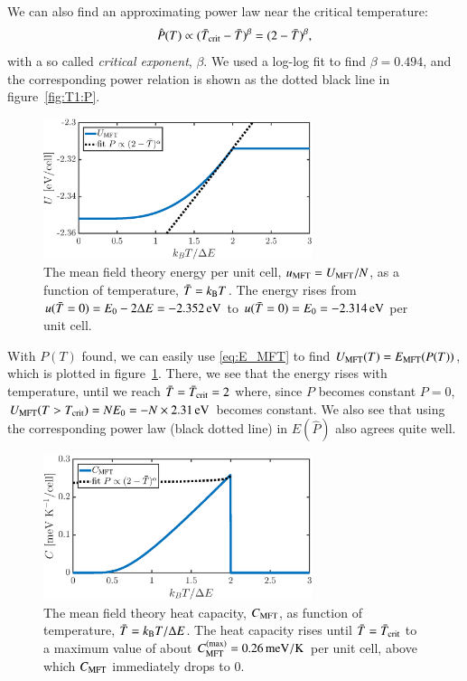 We can also find an approximating power law near the critical
temperature:
\begin{equation}\label{eq:alpha}
\hat{P}(T)\propto (\bar{T}_{\rm crit}-\bar{T})^{\beta}=(2-\bar{T})^{\beta},
\end{equation}
with a so called \emph{critical exponent}, $\beta$. We used a log-log
fit to find $\beta=0.494$, and the corresponding power relation is
shown as the dotted black line in figure~\ref{fig:T1:P}. 


\begin{figure}[!ht]
\begin{center}
  \includegraphics[width=0.7\textwidth]{../figures/E_MFT} 
  \caption{The mean field theory energy per unit cell,
    $u_{\text{MFT}}=U_{\text{MFT}}/N$, as a function of temperature,
    $\bar{T}=k_\mathrm{B} T$. The energy rises from
    $u(\bar{T}=0)=E_0-2\Delta{E}=\unit[-2.352]{eV}$ to
    $u(\bar{T}=0)=E_0=\unit[-2.314]{eV}$ per unit cell. }
  \label{fig:T1:E}
\end{center}
\end{figure}

With $P(T)$ found, we can easily use \eqref{eq:E_MFT} to find
$U_{\text{MFT}}(T)=E_{\text{MFT}}(P(T))$, which is plotted in
figure~\ref{fig:T1:E}. There, we see that the energy rises with
temperature, until we reach $\bar{T}=\bar{T}_{\rm crit}=2$ where,
since $P$ becomes constant $P=0$, $U_{\MFT}(T>T_{\rm crit})=N
E_0=-N\times\unit[2.31]{eV}$ becomes constant. We also see that using
the corresponding power law (black dotted line) in $E(\hat{P})$ also
agrees quite well. 

\begin{figure}[!ht]
\begin{center}
  \includegraphics[width=0.7\textwidth]{../figures/C_MFT} 
  \caption{The mean field theory heat capacity, $C_{\text{MFT}}$, as
    function of temperature, $\bar{T}=k_\mathrm{B} T/\Delta{E}$. The heat
    capacity rises until $\bar{T}=\bar{T}_{\rm crit}$ to a maximum
    value of about $C_{\MFT}^{(\max)}=\unit[0.26]{meV/K}$ per unit
    cell, above which $C_{\text{MFT}}$ immediately drops to $0$.}
  \label{fig:T1:C}
\end{center}
\end{figure}


